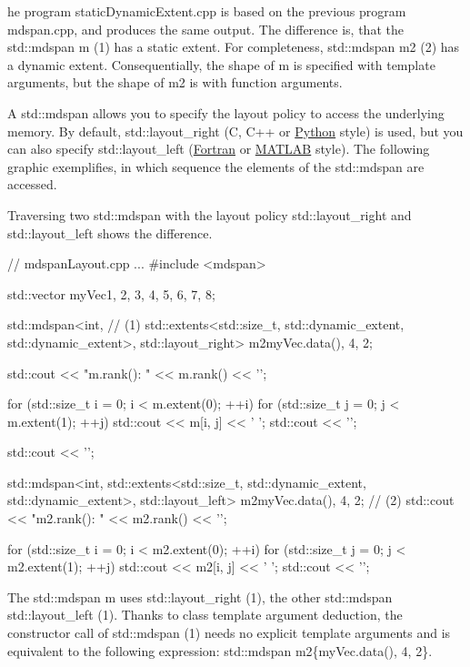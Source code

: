 he program staticDynamicExtent.cpp is based on the previous program mdspan.cpp, and produces the same output. The difference is, that the std::mdspan m (1) has a static extent. For completeness, std::mdspan m2 (2) has a dynamic extent. Consequentially, the shape of m is specified with template arguments, but the shape of m2 is with function arguments.

A std::mdspan allows you to specify the layout policy to access the underlying memory. By default, std::layout\_right (C, C++ or \href{https://en.wikipedia.org/wiki/Python_(programming_language)}{Python} style) is used, but you can also specify std::layout\_left (\href{https://en.wikipedia.org/wiki/Fortran}{Fortran} or \href{https://en.wikipedia.org/wiki/MATLAB}{MATLAB} style). The following graphic exemplifies, in which sequence the elements of the std::mdspan are accessed.


Traversing two std::mdspan with the layout policy std::layout\_right and std::layout\_left shows the difference.


\begin{cpp}
// mdspanLayout.cpp
...
#include <mdspan>

std::vector myVec{1, 2, 3, 4, 5, 6, 7, 8};

std::mdspan<int, // (1)
	std::extents<std::size_t, std::dynamic_extent, std::dynamic_extent>,
	std::layout_right> m2{myVec.data(), 4, 2};

std::cout << "m.rank(): " << m.rank() << '\n';

for (std::size_t i = 0; i < m.extent(0); ++i) {
	for (std::size_t j = 0; j < m.extent(1); ++j) {
		std::cout << m[i, j] << ' ';
	}
	std::cout << '\n';
}

std::cout << '\n';

std::mdspan<int,
	std::extents<std::size_t, std::dynamic_extent, std::dynamic_extent>,
	std::layout_left> m2{myVec.data(), 4, 2}; // (2)
std::cout << "m2.rank(): " << m2.rank() << '\n';

for (std::size_t i = 0; i < m2.extent(0); ++i) {
	for (std::size_t j = 0; j < m2.extent(1); ++j) {
		std::cout << m2[i, j] << ' ';
	}
	std::cout << '\n';
}
\end{cpp}

The std::mdspan m uses std::layout\_right (1), the other std::mdspan std::layout\_left (1). Thanks to class template argument deduction, the constructor call of std::mdspan (1) needs no explicit template arguments and is equivalent to the following expression: std::mdspan m2\{myVec.data(), 4, 2\}.


